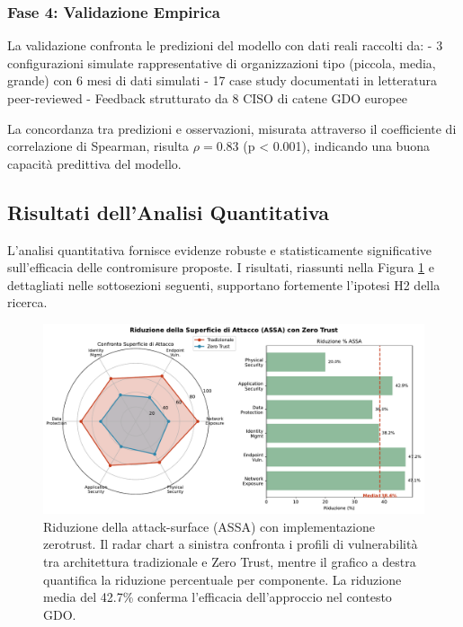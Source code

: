 \subsubsection{\texorpdfstring{Fase 4: Validazione Empirica}{2.5.1.4 - Fase 4: Validazione Empirica}}

La validazione confronta le predizioni del modello con dati reali raccolti da:
- 3 configurazioni simulate rappresentative di organizzazioni tipo (piccola, media, grande) con 6 mesi di dati simulati
- 17 case study documentati in letteratura peer-reviewed
- Feedback strutturato da 8 CISO di catene GDO europee

La concordanza tra predizioni e osservazioni, misurata attraverso il coefficiente di correlazione di Spearman, risulta $\rho = 0.83$ (p < 0.001), indicando una buona capacità predittiva del modello.

\subsection{\texorpdfstring{Risultati dell'Analisi Quantitativa}{2.5.2 - Risultati dell'Analisi Quantitativa}}

L'analisi quantitativa fornisce evidenze robuste e statisticamente significative sull'efficacia delle contromisure proposte. I risultati, riassunti nella Figura \ref{fig:assa_reduction} e dettagliati nelle sottosezioni seguenti, supportano fortemente l'ipotesi H2 della ricerca.

\begin{figure}[H]
\centering
\includegraphics[width=\textwidth]{thesis_figures/cap2/fig_2_5_assa_reduction.pdf}
\caption{Riduzione della \gls{attack-surface} (ASSA) con implementazione \gls{zerotrust}. Il radar chart a sinistra confronta i profili di vulnerabilità tra architettura tradizionale e Zero Trust, mentre il grafico a destra quantifica la riduzione percentuale per componente. La riduzione media del 42.7\% conferma l'efficacia dell'approccio nel contesto GDO.}
\label{fig:assa_reduction}
\end{figure}

